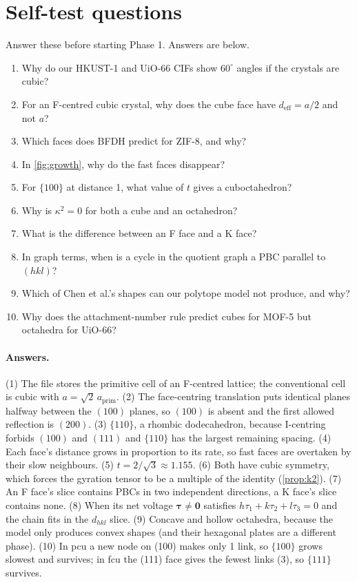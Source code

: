 \documentclass[11pt,a4paper]{article}
\theoremstyle{remark}\newtheorem*{example}{Worked example}
\newcommand{\vect}[1]{\mathbf{#1}}
\begin{document}
\section{Self-test questions}
Answer these before starting Phase 1. Answers are below.
\begin{enumerate}
\item Why do our HKUST-1 and UiO-66 CIFs show $60^\circ$ angles if the crystals are cubic?
\item For an F-centred cubic crystal, why does the cube face have $d_{\text{eff}}=a/2$ and not $a$?
\item Which faces does BFDH predict for ZIF-8, and why?
\item In \autoref{fig:growth}, why do the fast faces disappear?
\item For $\{100\}$ at distance 1, what value of $t$ gives a cuboctahedron?
\item Why is $\kappa^2=0$ for both a cube and an octahedron?
\item What is the difference between an F face and a K face?
\item In graph terms, when is a cycle in the quotient graph a PBC parallel to $(hkl)$?
\item Which of Chen et al.'s shapes can our polytope model not produce, and why?
\item Why does the attachment-number rule predict cubes for MOF-5 but octahedra for UiO-66?
\end{enumerate}
\paragraph{Answers.}
(1) The file stores the primitive cell of an F-centred lattice; the conventional cell is cubic with $a=\sqrt2\,a_{\text{prim}}$.
(2) The face-centring translation puts identical planes halfway between the $(100)$ planes, so $(100)$ is absent and the first allowed reflection is $(200)$.
(3) $\{110\}$, a rhombic dodecahedron, because I-centring forbids $(100)$ and $(111)$ and $\{110\}$ has the largest remaining spacing.
(4) Each face's distance grows in proportion to its rate, so fast faces are overtaken by their slow neighbours.
(5) $t=2/\sqrt3\approx1.155$.
(6) Both have cubic symmetry, which forces the gyration tensor to be a multiple of the identity (\autoref{prop:k2}).
(7) An F face's slice contains PBCs in two independent directions, a K face's slice contains none.
(8) When its net voltage $\vect{\tau}\neq\vect0$ satisfies $h\tau_1+k\tau_2+l\tau_3=0$ and the chain fits in the $d_{hkl}$ slice.
(9) Concave and hollow octahedra, because the model only produces convex shapes (and their hexagonal plates are a different phase).
(10) In pcu a new node on (100) makes only 1 link, so $\{100\}$ grows slowest and survives; in fcu the (111) face gives the fewest links (3), so $\{111\}$ survives.
\end{document}
